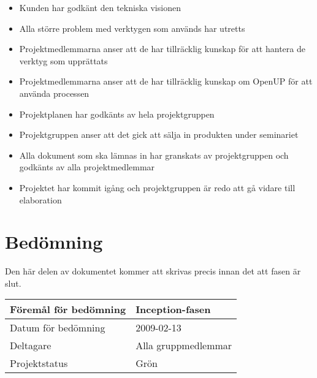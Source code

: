 \begin{itemize}
	\item Kunden har godkänt den tekniska visionen
	\item Alla större problem med verktygen som används har utretts
	\item Projektmedlemmarna anser att de har tillräcklig kunskap för att hantera de verktyg som upprättats
	\item Projektmedlemmarna anser att de har tillräcklig kunskap om OpenUP för att använda processen
	\item Projektplanen har godkänts av hela projektgruppen
	\item Projektgruppen anser att det gick att sälja in produkten under seminariet
	\item Alla dokument som ska lämnas in har granskats av projektgruppen och godkänts av alla projektmedlemmar
	\item Projektet har kommit igång och projektgruppen är redo att gå vidare till elaboration
\end{itemize}

\section{Bedömning}
Den här delen av dokumentet kommer att skrivas precis innan det att fasen är slut.

\begin{center}
	\begin{tabular}{| l | l |}
		\hline Föremål för bedömning & Inception-fasen \\
		\hline Datum för bedömning & 2009-02-13 \\
		\hline Deltagare & Alla gruppmedlemmar \\
		\hline Projektstatus & Grön \\
		\hline
	\end{tabular}
\end{center}

